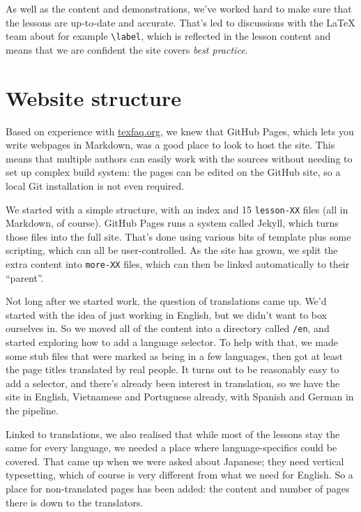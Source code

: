 \documentclass[harvardcite]{ltugboat}
\begin{document}
As well as the content and demonstrations, we've worked hard to make sure that
the lessons are up-to-date and accurate. That's led to discussions with the
\LaTeX{} team about for example \verb|\label|, which is reflected in the lesson
content and means that we are confident the site covers \emph{best practice}.

\section{Website structure}

Based on experience with \url{texfaq.org}, we knew that GitHub Pages, which
lets you write webpages in Markdown, was a good place to look to host the site.
This means that multiple authors can easily work with the sources without
needing to set up complex build system: the pages can be edited on the GitHub
site, so a local Git installation is not even required.

We started with a simple structure, with an index and 15 \texttt{lesson-XX}
files (all in Markdown, of course). GitHub Pages runs a system called Jekyll,
which turns those files into the full site. That's done using various bits of
template plus some scripting, which can all be user-controlled. As the site has
grown, we split the extra content into \texttt{more-XX} files, which can then
be linked automatically to their \enquote{parent}.

Not long after we started work, the question of translations came up. We'd started
with the idea of just working in English, but we didn't want to box ourselves in.
So we moved all of the content into a directory called \texttt{/en}, and started
exploring how to add a language selector. To help with that, we made some stub
files that were marked as being in a few languages, then got at least the
page titles translated by real people. It turns out to be reasonably easy
to add a selector, and there's already been interest in translation, so
we have the site in English, Vietnamese and Portuguese already, with Spanish
and German in the pipeline.

Linked to translations, we also realised that while most of the lessons stay
the same for every language, we needed a place where language-specifics could
be covered. That came up when we were asked about Japanese; they need vertical
typesetting, which of course is very different from what we need for English.
So a place for non-translated pages has been added: the content and number of
pages there is down to the translators.
\end{document}
